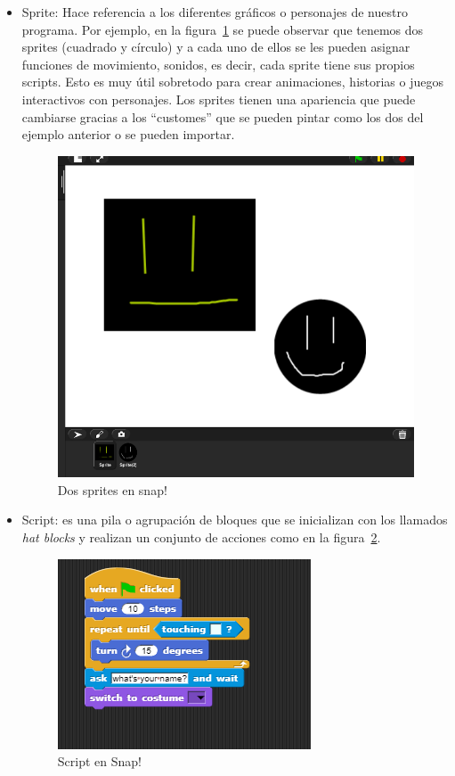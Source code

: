\documentclass[a4paper, 12pt]{book}
\begin{document}
\begin{itemize}

	\item Sprite: Hace referencia a los diferentes gráficos o personajes de nuestro 		programa. Por ejemplo, en la figura~\ref{figura:sprites} se puede observar que tenemos 	dos sprites (cuadrado y círculo) y a cada uno de ellos se les pueden asignar funciones de 	movimiento, sonidos, es decir, cada sprite tiene sus propios scripts. Esto es muy útil 	sobretodo para crear animaciones, historias o juegos interactivos con personajes. Los sprites tienen una apariencia que puede cambiarse gracias a los ``customes''
    que se pueden pintar como los dos del ejemplo  anterior o se pueden importar.
    
	    \begin{figure}[h]
		\centering
		\includegraphics[scale=0.3]{img/sprite.png}
		\caption{Dos sprites en snap!}
		\label{figura:sprites}
	    \end{figure}
	\item Script: es una pila o agrupación de bloques que se inicializan con los llamados 	\textit{hat blocks} y realizan un conjunto de acciones como en la 		figura~\ref{figura:script}. 
    
     \begin{figure}[h]
        \centering
        \includegraphics[scale=1]{img/script.PNG}
        \caption{Script en Snap!}
        \label{figura:script}
    \end{figure}    
	    

\end{itemize}
\end{document}
